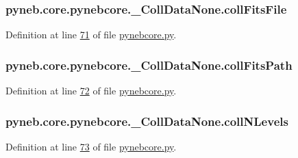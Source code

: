 \subsubsection[{coll\+Fits\+File}]{\setlength{\rightskip}{0pt plus 5cm}pyneb.\+core.\+pynebcore.\+\_\+\+Coll\+Data\+None.\+coll\+Fits\+File}\label{classpyneb_1_1core_1_1pynebcore_1_1___coll_data_none_acb2dc662b7ca086e2d3322b79993fc60}


Definition at line \hyperlink{pynebcore_8py_source_l00071}{71} of file \hyperlink{pynebcore_8py_source}{pynebcore.\+py}.

\hypertarget{classpyneb_1_1core_1_1pynebcore_1_1___coll_data_none_ad3bac87fe373ebf85361cc6c86b25c97}{}
\subsubsection[{coll\+Fits\+Path}]{\setlength{\rightskip}{0pt plus 5cm}pyneb.\+core.\+pynebcore.\+\_\+\+Coll\+Data\+None.\+coll\+Fits\+Path}\label{classpyneb_1_1core_1_1pynebcore_1_1___coll_data_none_ad3bac87fe373ebf85361cc6c86b25c97}


Definition at line \hyperlink{pynebcore_8py_source_l00072}{72} of file \hyperlink{pynebcore_8py_source}{pynebcore.\+py}.

\hypertarget{classpyneb_1_1core_1_1pynebcore_1_1___coll_data_none_aa6cfd6d6afa856ba4c102acc9180df42}{}
\subsubsection[{coll\+N\+Levels}]{\setlength{\rightskip}{0pt plus 5cm}pyneb.\+core.\+pynebcore.\+\_\+\+Coll\+Data\+None.\+coll\+N\+Levels}\label{classpyneb_1_1core_1_1pynebcore_1_1___coll_data_none_aa6cfd6d6afa856ba4c102acc9180df42}


Definition at line \hyperlink{pynebcore_8py_source_l00073}{73} of file \hyperlink{pynebcore_8py_source}{pynebcore.\+py}.



